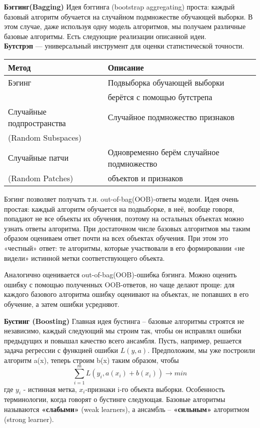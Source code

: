 \textbf{Бэггинг(Bagging)}
Идея бэггинга (bootstrap aggregating) проста: каждый базовый алгоритм обучается на случайном подмножестве обучающей выборки. В этом случае, даже используя одну модель алгоритмов, мы получаем различные базовые алгоритмы. Есть следующие реализации описанной идеи. \\
\textbf{Бутстрэп} --- универсальный инструмент для оценки статистической точности.
\begin{center}
\begin{tabular}{l|l} 
    \hline\hline
    Метод  & Описание \\
     \hline\hline
    Бэгинг  & Подвыборка обучающей выборки \\
     & берётся с помощью бутстрепа \\
     \hline
    Случайные подпространства & Случайное подмножество признаков \\
    (Random Subspaces) & \\
    \hline
    Случайные патчи & Одновременно берём случайное подмножество \\
    (Random Patches) & объектов и признаков

 \end{tabular}
\end{center}

Бэгинг позволяет получать т.н. out-of-bag(OOB)-ответы модели. Идея очень простая: каждый алгоритм обучается на подвыборке, в неё, вообще говоря, попадают не все объекты их обучения, поэтому на остальных объектах можно узнать ответы алгоритма. При достаточном числе базовых алгоритмов мы таким образом оцениваем ответ почти на всех объектах обучения. При этом это «честный» ответ: те алгоритмы, которые участвовали в его формировании «не видели» истинной метки соответствующего объекта.

Аналогично оценивается out-of-bag(OOB)-ошибка бэгинга. Можно оценить ошибку с помощью полученных  OOB-ответов, но чаще делают проще: для каждого базового алгоритма ошибку оценивают на объектах, не попавших в его обучение, а затем ошибки усредняют.

\textbf{Бустинг (Boosting)}
Главная идея бустинга – базовые алгоритмы строятся не независимо, каждый следующий мы строим так, чтобы он исправлял ошибки предыдущих и повышал качество всего ансамбля. Пусть, например, решается задача регрессии с функцией ошибки $L(y, a)$. Предположим, мы уже построили алгоритм a(x), теперь строим b(x) таким образом, чтобы
\begin{equation}
    \displaystyle\sum_{i=1}^{m} L(y_i, a(x_i) + b(x_i)) \xrightarrow{} min
\end{equation}
где $y_i$ - истинная метка, $x_i$-признаки i-го объекта выборки.
Особенность терминологии, когда говорят о бустинге следующая. Базовые алгоритмы называются \textbf{«слабыми»} (weak learners),  а ансамбль – \textbf{«сильным»} алгоритмом (strong learner).

